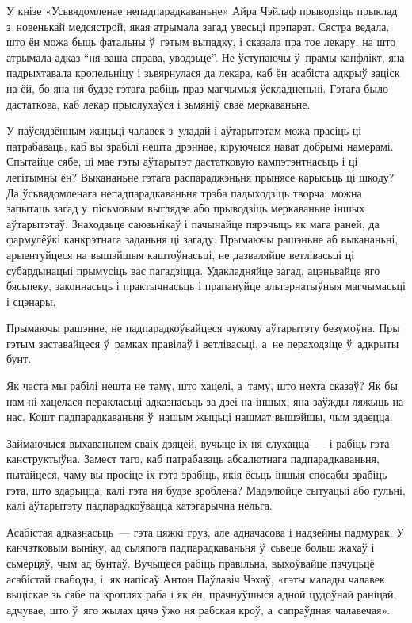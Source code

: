 У кнізе «Усьвядомленае непадпарадкаваньне» Айра Чэйлаф прыводзіць прыклад з~новенькай медсястрой, якая атрымала загад увесьці прэпарат. Сястра ведала, што ён можа быць фатальны ў~гэтым выпадку, і сказала пра тое лекару, на што атрымала адказ ``ня ваша справа, уводзьце''. Не ўступаючы ў~прамы канфлікт, яна падрыхтавала кропельніцу і зьвярнулася да лекара, каб ён асабіста адкрыў заціск на ёй, бо яна ня будзе гэтага рабіць праз магчымыя ўскладненьні. Гэтага было дастаткова, каб лекар прыслухаўся і зьмяніў сваё меркаваньне. 

У паўсядзённым жыцьці чалавек з~уладай і аўтарытэтам можа прасіць ці патрабаваць, каб вы зрабілі нешта дрэннае, кіруючыся нават добрымі намерамі. Спытайце сябе, ці мае гэты аўтарытэт дастатковую кампэтэнтнасьць і ці легітымны ён? Выкананьне гэтага распараджэньня прынясе карысьць ці шкоду? Да ўсьвядомленага непадпарадкаваньня трэба падыходзіць творча: можна запытаць загад у~пісьмовым выглядзе або прыводзіць меркаваньне іншых аўтарытэтаў. Знаходзьце саюзьнікаў і пачынайце пярэчыць як мага раней, да фармулёўкі канкрэтнага заданьня ці загаду. Прымаючы рашэньне аб выкананьні, арыентуйцеся на вышэйшыя каштоўнасьці, не дазваляйце ветлівасьці ці субардынацыі прымусіць вас пагадзіцца. Удакладняйце загад, ацэньвайце яго бясьпеку, законнасьць і практычнасьць і прапануйце альтэрнатыўныя магчымасьці і сцэнары.

Прымаючы рашэнне, не падпарадкоўвайцеся чужому аўтарытэту безумоўна. Пры гэтым заставайцеся ў~рамках правілаў і ветлівасьці, а~не пераходзіце ў~адкрыты бунт.

Як часта мы рабілі нешта не таму, што хацелі, а~таму, што нехта сказаў? Як бы нам ні хацелася перакласьці адказнасьць за дзеі на іншых, яна заўжды ляжыць на нас. Кошт падпарадкаваньня ў~нашым жыцьці нашмат вышэйшы, чым здаецца.

Займаючыся выхаваньнем сваіх дзяцей, вучыце іх ня слухацца~--- і рабіць гэта канструктыўна. Замест таго, каб патрабаваць абсалютнага падпарадкаваньня, пытайцеся, чаму вы просіце іх гэта зрабіць, якія ёсьць іншыя спосабы зрабіць гэта, што здарыцца, калі гэта ня будзе зроблена? Мадэлюйце сытуацыі або гульні, калі аўтарытэту падпарадкоўвацца катэгарычна нельга. 

Асабістая адказнасьць~--- гэта цяжкі груз, але адначасова і надзейны падмурак. У канчатковым выніку, ад сьляпога падпарадкаваньня ў~сьвеце больш жахаў і сьмерцяў, чым ад бунтаў. Вучыцеся рабіць правільна, выхоўвайце пачуцьцё асабістай свабоды, і, як напісаў Антон Паўлавіч Чэхаў, «гэты малады чалавек выціскае зь сябе па кроплях раба і як ён, прачнуўшыся адной цудоўнай раніцай, адчувае, што ў~яго жылах цячэ ўжо ня рабская кроў, а~сапраўдная чалавечая».

